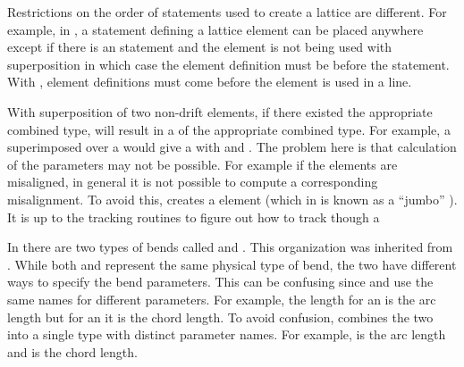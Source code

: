 \begin{description}
\item
Restrictions on the order of statements used to create a lattice are different. 
For example, in \bmad, a statement defining a lattice element can be placed anywhere
except if there is an  statement and the element is not being used
with superposition in which case the element definition must be before the 
statement. With \accellat, element definitions must come before the element is used in a line.
%
\item
With \bmad superposition of two non-drift elements, if there existed the appropriate
combined type, will result in a  of the appropriate combined type. For example,
a  superimposed over a  would give a   with
 and  . The problem here is that calculation of the
 parameters may not be possible. For example if the 
elements are misaligned, in general it is not possible to compute a corresponding 
misalignment. To avoid this, \accellat creates a   element
(which in \bmad is known as a ``jumbo'' ). It is up to the tracking routines to
figure out how to track though a 
%
\item
In  there are two types of bends called  and . 
This organization was inherited from . While both  and 
represent the same physical type of bend, the two have different ways to specify the bend parameters. 
This can be confusing since  and  use the same names for different parameters.
For example, the length  for an  is the arc length but for an  it is the
chord length. To avoid confusion, \accellat combines the two into a single  type with
distinct parameter names. For example,  is the arc length and  is the chord length.
\end{description}



